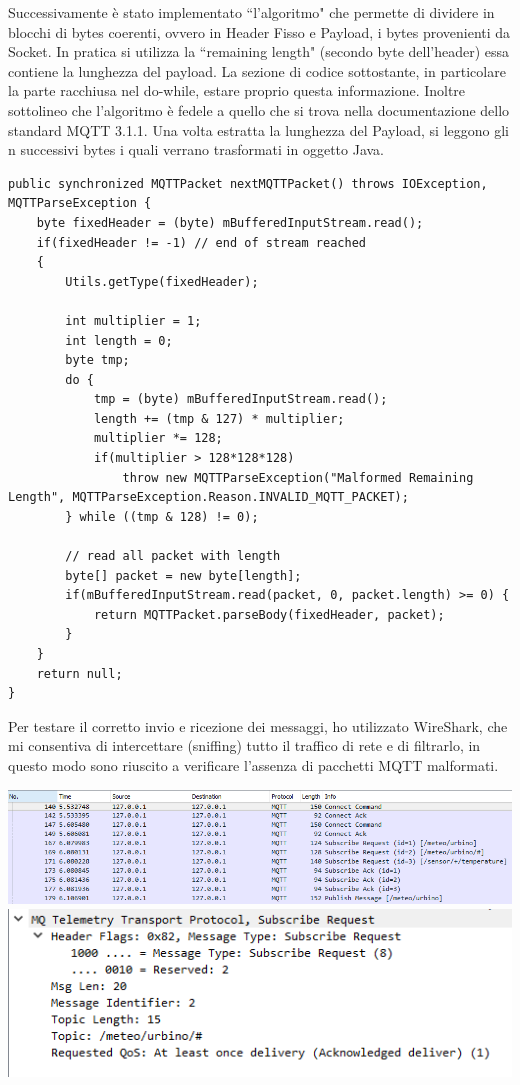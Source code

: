 \documentclass{article}
\begin{document}
Successivamente è stato implementato ``l'algoritmo" che permette di dividere in blocchi di bytes coerenti, ovvero in Header Fisso e Payload, i bytes provenienti da Socket. In pratica si utilizza la ``remaining length" (secondo byte dell'header) essa contiene la lunghezza del payload. La sezione di codice sottostante, in particolare la parte racchiusa nel do-while, estare proprio questa informazione. Inoltre sottolineo che l'algoritmo è fedele a quello che si trova nella documentazione dello standard MQTT 3.1.1. Una volta estratta la lunghezza del Payload, si leggono gli n successivi bytes i quali verrano trasformati in oggetto Java. 
\begin{lstlisting}[style=JavaStyle]
public synchronized MQTTPacket nextMQTTPacket() throws IOException, MQTTParseException {
	byte fixedHeader = (byte) mBufferedInputStream.read();
	if(fixedHeader != -1) // end of stream reached
	{
		Utils.getType(fixedHeader);
		
		int multiplier = 1;
		int length = 0;
		byte tmp;
		do {
			tmp = (byte) mBufferedInputStream.read();
			length += (tmp & 127) * multiplier;
			multiplier *= 128;
			if(multiplier > 128*128*128)
				throw new MQTTParseException("Malformed Remaining Length", MQTTParseException.Reason.INVALID_MQTT_PACKET);
		} while ((tmp & 128) != 0);
		
		// read all packet with length
		byte[] packet = new byte[length];
		if(mBufferedInputStream.read(packet, 0, packet.length) >= 0) {
			return MQTTPacket.parseBody(fixedHeader, packet);
		}
	}
	return null;
}
\end{lstlisting}
Per testare il corretto invio e ricezione dei messaggi, ho utilizzato WireShark, che mi consentiva di intercettare (sniffing) tutto il traffico di rete e di filtrarlo, in questo modo sono riuscito a verificare l'assenza di pacchetti MQTT malformati.
\begin{center}
	\includegraphics[scale=0.6]{immagini/wireshark1.png}
	\includegraphics[scale=0.6]{immagini/wireshark2.png}
\end{center}
\end{document}

